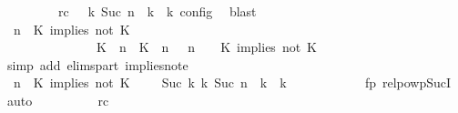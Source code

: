 \begin{isabellebody}
\ \ \ \ \ \ \ \ \ rc{\isacharcolon}{\isacartoucheopen}{\isasymrho}\ {\isasymin}\ {\isasymlbrakk}\ {\isasymGamma}\isactrlsub k{\isacharcomma}\ Suc\ n\ {\isasymturnstile}\ {\isasymPsi}\isactrlsub k\ {\isasymtriangleright}\ {\isasymPhi}\isactrlsub k\ {\isasymrbrakk}\isactrlsub c\isactrlsub o\isactrlsub n\isactrlsub f\isactrlsub i\isactrlsub g{\isacartoucheclose}\ \isamarkupfalse%
\ blast\isanewline
\ \ \ \ \ \ \ \ \isamarkupfalse%
\ {\isacartoucheopen}{\isacharparenleft}{\isasymGamma}{\isacharcomma}\ n\ {\isasymturnstile}\ {\isacharparenleft}{\isacharparenleft}K\ implies\ not\ K\ {\isacharhash}\ {\isasymPsi}{\isacharparenright}\ {\isasymtriangleright}\ {\isasymPhi}{\isacharparenright}\isanewline
\ \ \ \ \ \ \ \ \ \ \ \ \ \ {\isasymhookrightarrow}\ {\isacharparenleft}{\isacharparenleft}{\isacharparenleft}K\ {\isasymUp}\ n{\isacharparenright}\ {\isacharhash}\ {\isacharparenleft}K\ {\isasymnot}{\isasymUp}\ n{\isacharparenright}\ {\isacharhash}\ {\isasymGamma}{\isacharparenright}{\isacharcomma}\ n\ {\isasymturnstile}\ {\isasymPsi}\ {\isasymtriangleright}\ {\isacharparenleft}{\isacharparenleft}K\ implies\ not\ K\ {\isacharhash}\ {\isasymPhi}{\isacharparenright}{\isacharparenright}{\isacartoucheclose}\isanewline
\ \ \ \ \ \ \ \ \ \ \isamarkupfalse%
\ {\isacharparenleft}simp\ add{\isacharcolon}\ elims{\isacharunderscore}part\ implies{\isacharunderscore}not{\isacharunderscore}e{}{\isacharparenright}\isanewline
\ \ \ \ \ \ \ \ \isamarkupfalse%
\ {\isacartoucheopen}{\isacharparenleft}{\isasymGamma}{\isacharcomma}\ n\ {\isasymturnstile}\ {\isacharparenleft}{\isacharparenleft}K\ implies\ not\ K\ {\isacharhash}\ {\isasymPsi}{\isacharparenright}\ {\isasymtriangleright}\ {\isasymPhi}{\isacharparenright}\ {\isasymhookrightarrow}\isactrlbsup Suc\ k\isactrlesup \ {\isacharparenleft}{\isasymGamma}\isactrlsub k{\isacharcomma}\ Suc\ n\ {\isasymturnstile}\ {\isasymPsi}\isactrlsub k\ {\isasymtriangleright}\ {\isasymPhi}\isactrlsub k{\isacharparenright}{\isacartoucheclose}\isanewline
\ \ \ \ \ \ \ \ \ \ \isamarkupfalse%
\ fp\ relpowp{\isacharunderscore}Suc{\isacharunderscore}I{}\ \isamarkupfalse%
\ auto\isanewline
\ \ \ \ \ \ \ \ \isamarkupfalse%
\ rc\ \isamarkupfalse%

\end{isabellebody}
